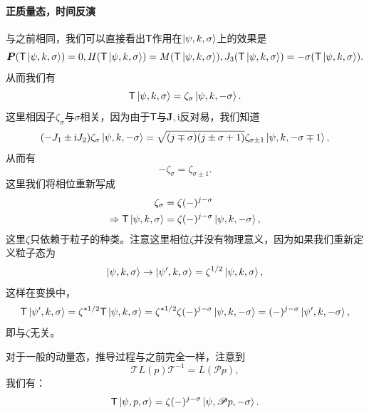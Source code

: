 \paragraph{正质量态，时间反演}
与之前相同，我们可以直接看出$\mathsf{T}$作用在$\ket{\psi ,k,\sigma }$上的效果是
\begin{equation*}
	\boldsymbol{P} (\mathsf{T}\ket{\psi ,k,\sigma } )=0,H(\mathsf{T}\ket{\psi ,k,\sigma } )=M(\mathsf{T}\ket{\psi ,k,\sigma } ),J_{3} (\mathsf{T}\ket{\psi ,k,\sigma } )=-\sigma (\mathsf{T}\ket{\psi ,k,\sigma } ).
\end{equation*}
从而我们有
\begin{equation*}
	\mathsf{T}\ket{\psi ,k,\sigma } =\zeta _{\sigma }\ket{\psi ,k,-\sigma } .
\end{equation*}
这里相因子$\zeta _{\sigma }$与$\sigma $相关，因为由于$\mathsf{T}$与$\boldsymbol{J} ,\mathrm{i}$反对易，我们知道
\begin{equation*}
	( -J_{1} \pm \mathrm{i} J_{2}) \zeta _{\sigma }\ket{\psi ,k,-\sigma } =\sqrt{( j\mp \sigma )( j\pm \sigma +1)} \zeta _{\sigma \pm 1}\ket{\psi ,k,-\sigma \mp 1} ,
\end{equation*}
从而有
\begin{equation*}
	-\zeta _{\sigma } =\zeta _{\sigma \pm 1} .
\end{equation*}
这里我们将相位重新写成
\begin{equation*}
	\begin{aligned}
		\zeta _{\sigma } & =\zeta ( -)^{j-\sigma }\\
		\Rightarrow \mathsf{T}\ket{\psi ,k,\sigma } & =\zeta ( -)^{j-\sigma }\ket{\psi ,k,-\sigma } ,
	\end{aligned}
\end{equation*}
这里$\zeta $只依赖于粒子的种类。注意这里相位$\zeta $并没有物理意义，因为如果我们重新定义粒子态为
\begin{equation*}
	\ket{\psi ,k,\sigma }\rightarrow \ket{\psi ',k,\sigma } =\zeta ^{1/2}\ket{\psi ,k,\sigma } ,
\end{equation*}
这样在变换中，
\begin{equation*}
	\mathsf{T}\ket{\psi ',k,\sigma } =\zeta ^{*1/2}\mathsf{T}\ket{\psi ,k,\sigma } =\zeta ^{*1/2} \zeta ( -)^{j-\sigma }\ket{\psi ,k,-\sigma } =( -)^{j-\sigma }\ket{\psi ',k,-\sigma } ,
\end{equation*}
即与$\zeta $无关。

对于一般的动量态，推导过程与之前完全一样，注意到
\begin{equation*}
	\mathscr{T} L( p)\mathscr{T}^{-1} =L(\mathscr{P} p) ,
\end{equation*}
我们有：
\begin{equation*}
	\mathsf{T}\ket{\psi ,p,\sigma } =\zeta ( -)^{j-\sigma }\ket{\psi ,\mathscr{P} p,-\sigma } .
\end{equation*}

